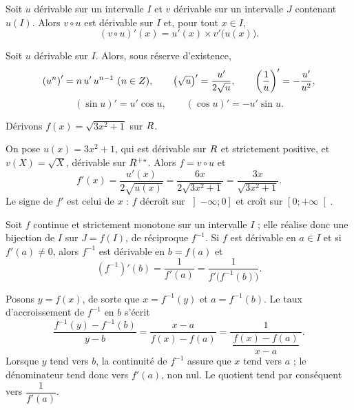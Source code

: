 \begin{theoreme}
Soit $u$ dérivable sur un intervalle $I$ et $v$ dérivable sur un intervalle
$J$ contenant $u(I)$. Alors $v \circ u$ est dérivable sur $I$ et, pour tout
$x \in I$,
\[
  (v \circ u)'(x) = u'(x) \times v'\bigl(u(x)\bigr).
\]
\end{theoreme}


\begin{propriete}
Soit $u$ dérivable sur $I$. Alors, sous réserve d'existence,
\[
  \left(u^{n}\right)' = n\,u'\,u^{n-1} \ (n \in Z), \qquad
  \left(\sqrt{u}\right)' = \frac{u'}{2\sqrt{u}}, \qquad
  \left(\frac{1}{u}\right)' = -\frac{u'}{u^{2}},
\]
\[
  \left(\sin u\right)' = u'\cos u, \qquad \left(\cos u\right)' = -u'\sin u .
\]
\end{propriete}

\begin{exemple}
Dérivons $f(x) = \sqrt{3x^{2}+1}$ sur $R$.

On pose $u(x) = 3x^{2}+1$, qui est dérivable sur $R$ et strictement positive,
et $v(X) = \sqrt{X}$, dérivable sur $R^{+*}$. Alors $f = v \circ u$ et
\[
  f'(x) = \frac{u'(x)}{2\sqrt{u(x)}} = \frac{6x}{2\sqrt{3x^{2}+1}}
        = \frac{3x}{\sqrt{3x^{2}+1}} .
\]
Le signe de $f'$ est celui de $x$ : $f$ décroît sur $\left]-\infty ; 0\right]$
et croît sur $\left[0 ; +\infty\right[$.
\end{exemple}

\begin{theoreme}
Soit $f$ continue et strictement monotone sur un intervalle $I$ ; elle réalise
donc une bijection de $I$ sur $J = f(I)$, de réciproque $f^{-1}$. Si $f$ est
dérivable en $a \in I$ et si $f'(a) \neq 0$, alors $f^{-1}$ est dérivable en
$b = f(a)$ et
\[
  \left(f^{-1}\right)'(b) = \frac{1}{f'(a)} = \frac{1}{f'\bigl(f^{-1}(b)\bigr)} .
\]
\end{theoreme}

\begin{demonstration}
Posons $y = f(x)$, de sorte que $x = f^{-1}(y)$ et $a = f^{-1}(b)$. Le taux
d'accroissement de $f^{-1}$ en $b$ s'écrit
\[
  \frac{f^{-1}(y)-f^{-1}(b)}{y-b} = \frac{x-a}{f(x)-f(a)}
  = \frac{1}{\ \dfrac{f(x)-f(a)}{x-a}\ }.
\]
Lorsque $y$ tend vers $b$, la continuité de $f^{-1}$ assure que $x$ tend vers
$a$ ; le dénominateur tend donc vers $f'(a)$, non nul. Le quotient tend par
conséquent vers $\dfrac{1}{f'(a)}$.
\end{demonstration}

